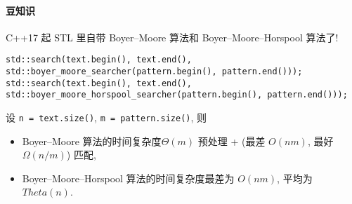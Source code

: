 \paragraph{豆知识}

C++17 起 STL 里自带 Boyer--Moore 算法和 Boyer--Moore--Horspool 算法了!

\begin{verbatim}
std::search(text.begin(), text.end(), std::boyer_moore_searcher(pattern.begin(), pattern.end()));
std::search(text.begin(), text.end(), std::boyer_moore_horspool_searcher(pattern.begin(), pattern.end()));
\end{verbatim}

设 \verb|n = text.size()|, \verb|m = pattern.size()|, 则

\begin{itemize}
    \item Boyer--Moore 算法的时间复杂度\(\Theta(m)\) 预处理 + (最差 \(O(nm)\), 最好 \(\Omega(n/m)\)) 匹配, \cite{enwiki:1185721721}
    \item Boyer--Moore--Horspool 算法的时间复杂度最差为 \(O(nm)\), 平均为 \(Theta(n)\). \cite{enwiki:1136480391}
\end{itemize}
